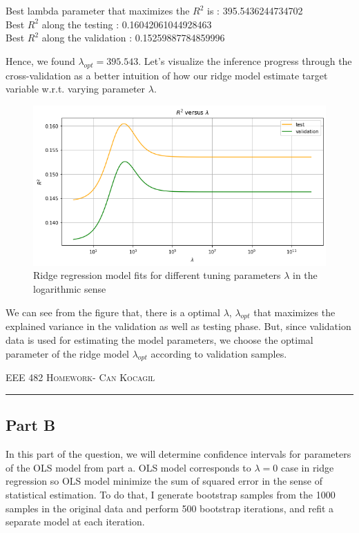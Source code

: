 \documentclass[12pt]{amsart}
\begin{document}
Best lambda parameter that maximizes the $R^2$ is : 395.5436244734702 \\
Best $R^2$ along the testing : 0.16042061044928463 \\ 
Best $R^2$ along the validation : 0.15259887784859996

\bigskip

Hence, we found $\lambda_{opt} = 395.543$. Let's visualize the inference progress through the cross-validation as a better intuition of how our ridge model estimate target variable w.r.t. varying parameter $\lambda$.

\begin{figure}[h]
    \centering
    \includegraphics[width = 1\textwidth]{images/2.png}
    \caption{Ridge regression model fits for different tuning parameters $\lambda$ in the logarithmic sense}
\end{figure}

We can see from the figure that, there is a optimal $\lambda$, $\lambda_{opt}$ that maximizes the explained variance in the validation as well as testing phase. But, since validation data is used for estimating the model parameters, we choose the optimal parameter of the ridge model $\lambda_{opt}$ according to validation samples.

\newpage
{\scshape EEE 482} \hfill {\scshape \large  Homework-\relax} \hfill {\scshape Can Kocagil}
\smallskip
\hrule
\vspace{2mm}

\subsection{Part B}

In this part of the question, we will determine confidence intervals for parameters of the OLS model from part a. OLS model corresponds to $\lambda = 0$ case in ridge regression so OLS model minimize the sum of squared error in the sense of statistical estimation. To do that, I generate bootstrap samples from the 1000 samples in the original data and perform 500 bootstrap iterations, and refit a separate model at each iteration. 
\end{document}

